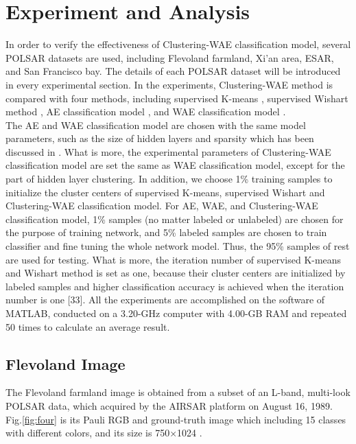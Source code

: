\documentclass[11pt, a4paper, onecolumn, oneside]{article}
\begin{document}
\section{Experiment and Analysis} \label{sec:four}

In order to verify the effectiveness of Clustering-WAE classification model, several POLSAR datasets are used, including Flevoland farmland, Xi’an area, ESAR, and San Francisco bay. The details of each POLSAR dataset will be introduced in every experimental section. In the experiments, Clustering-WAE method is compared with four methods, including supervised K-means \cite{ac, ad}, supervised Wishart method \cite{ae, af, ag}, AE classification model \cite{r}, and WAE classification model \cite{c}. \\

The AE and WAE classification model are chosen with the same model parameters, such as the size of hidden layers and sparsity which has been discussed in \cite{c}. What is more, the experimental parameters of Clustering-WAE classification model are set the same as WAE classification model, except for the part of hidden layer clustering. In addition, we choose 1\% training samples to initialize the cluster centers of supervised K-means, supervised Wishart and Clustering-WAE classification model. For AE, WAE, and Clustering-WAE classification model, 1\% samples (no matter labeled or unlabeled) are chosen for the purpose of training network, and 5\% labeled samples are chosen to train classifier and fine tuning the whole network model. Thus, the 95\% samples of rest are used for testing. What is more, the iteration number of supervised K-means and Wishart method is set as one, because their cluster centers are initialized by labeled samples and higher classification accuracy is achieved when the iteration number is one [33]. All the experiments are accomplished on the software of MATLAB, conducted on a 3.20-GHz computer with 4.00-GB RAM and repeated 50 times to calculate an average result.

\subsection{Flevoland Image}

The Flevoland farmland image is obtained from a subset of an L-band, multi-look POLSAR data, which acquired by the AIRSAR platform on August 16, 1989. Fig.\ref{fig:four} is its Pauli RGB and ground-truth image which including 15 classes with different colors, and its size is 750×1024 \cite{c}.
\end{document}
